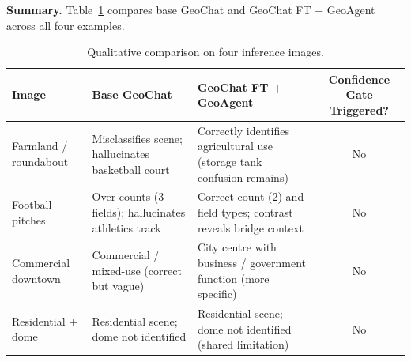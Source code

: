 \documentclass{article}
\begin{document}
\bigskip
\noindent\textbf{Summary.}
Table~\ref{tab:demo_summary} compares base GeoChat and GeoChat FT + GeoAgent
across all four examples.

\begin{table}[h]
  \caption{Qualitative comparison on four inference images.}
  \label{tab:demo_summary}
  \centering
  \small
  \begin{tabular}{p{2.8cm} p{5cm} p{5cm} c}
    \toprule
    \textbf{Image} & \textbf{Base GeoChat} & \textbf{GeoChat FT + GeoAgent} & \textbf{Confidence Gate Triggered?} \\
    \midrule
    Farmland / roundabout
      & Misclassifies scene; hallucinates basketball court
      & Correctly identifies agricultural use (storage tank confusion remains)
      & No \\[4pt]
    Football pitches
      & Over-counts (3 fields); hallucinates athletics track
      & Correct count (2) and field types; contrast reveals bridge context
      & No \\[4pt]
    Commercial downtown
      & Commercial / mixed-use (correct but vague)
      & City centre with business / government function (more specific)
      & No \\[4pt]
    Residential + dome
      & Residential scene; dome not identified
      & Residential scene; dome not identified (shared limitation)
      & No \\
    \bottomrule
  \end{tabular}
\end{table}
\end{document}
